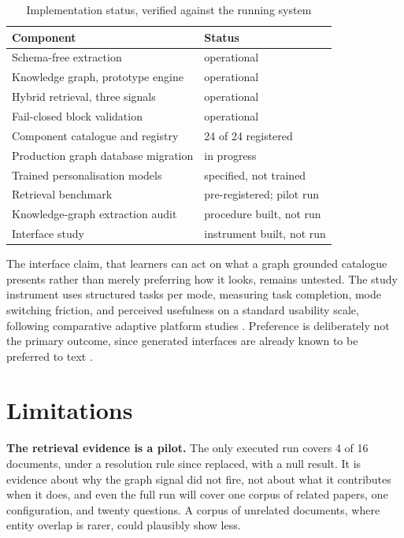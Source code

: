 \documentclass[conference]{IEEEtran}
\newcommand{\tbl}{\footnotesize}
\begin{document}
\begin{table}[t]
\caption{Implementation status, verified against the running system}
\label{tab:status}
\centering
\tbl
\begin{tabular}{@{}p{}p{}@{}}
\toprule
\textbf{Component} & \textbf{Status} \\
\midrule
Schema-free extraction & operational \\
Knowledge graph, prototype engine & operational \\
Hybrid retrieval, three signals & operational \\
Fail-closed block validation & operational \\
Component catalogue and registry & 24 of 24 registered \\
Production graph database migration & in progress \\
Trained personalisation models & specified, not trained \\
Retrieval benchmark & pre-registered; pilot run \\
Knowledge-graph extraction audit & procedure built, not run \\
Interface study & instrument built, not run \\
\bottomrule
\end{tabular}
\end{table}

The interface claim, that learners can act on what a graph grounded catalogue presents rather than merely preferring how it looks, remains untested. The study instrument uses structured tasks per mode, measuring task completion, mode switching friction, and perceived usefulness on a standard usability scale, following comparative adaptive platform studies \cite{ref:dascalu}. Preference is deliberately not the primary outcome, since generated interfaces are already known to be preferred to text \cite{ref:leviathan,ref:alignui}.
\section{Limitations}
\label{sec:limits}

\textbf{The retrieval evidence is a pilot.} The only executed run covers 4 of 16 documents, under a resolution rule since replaced, with a null result. It is evidence about why the graph signal did not fire, not about what it contributes when it does, and even the full run will cover one corpus of related papers, one configuration, and twenty questions. A corpus of unrelated documents, where entity overlap is rarer, could plausibly show less.
\end{document}
